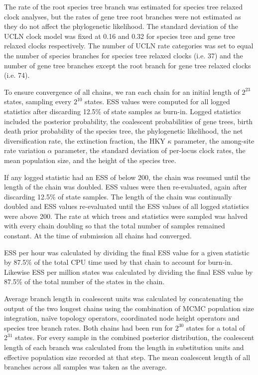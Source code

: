 \documentclass[12pt]{article}
\begin{document}
The rate of the root species tree branch was estimated for species tree relaxed
clock analyses, but the rates of gene tree root branches were not estimated as
they do not affect the phylogenetic likelihood. The standard deviation of the
UCLN clock model was fixed at 0.16 and 0.32 for species tree and gene tree
relaxed clocks respectively. The number of UCLN rate categories was set to equal
the number of species branches for species tree relaxed clocks (i.e. 37)
and the number of gene tree branches except the root branch for gene tree
relaxed clocks (i.e. 74).

To ensure convergence of all chains, we ran each chain for an initial length of
$2^{23}$ states, sampling every $2^{10}$ states. ESS values were computed for
all logged statistics after discarding 12.5\% of state samples as burn-in. Logged
statistics included the posterior probability, the
coalescent probabilities of gene trees, birth death prior
probability of the species tree, the phylogenetic likelihood, the net
diversification rate, the extinction fraction, the HKY $\kappa$ parameter, the
among-site rate variation $\alpha$ parameter, the standard deviation of
per-locus clock rates, the mean population size, and the height of the species tree.

If any logged statistic had an ESS of below 200, the chain was resumed until the
length of the chain was doubled. ESS values were then re-evaluated, again after
discarding 12.5\% of state samples. The length of the chain was continually
doubled and ESS values re-evaluated until the ESS values of all logged
statistics were above 200. The rate at which trees and statistics were sampled
was halved with every chain doubling so that the total number of samples
remained constant. At the time of submission all chains had converged.

ESS per hour was calculated by dividing the final ESS value for a given
statistic by 87.5\% of the total CPU time used by that chain to account for
burn-in. Likewise ESS per million states was calculated by dividing the final ESS
value by 87.5\% of the total number of the states in the chain. 

Average branch length in coalescent units was calculated by concatenating the
output of the two longest chains using the combination of MCMC population
size integration, na\"ive topology operators, coordinated node height operators
and species tree branch rates. Both chains had been run for $2^{30}$ states for
a total of $2^{31}$ states. For every sample in the combined posterior
distribution, the coalescent length of each branch was calculated from the
length in substitution units and effective population size recorded at that
step. The mean coalescent length of all branches across all samples was taken as
the average.
\end{document}
